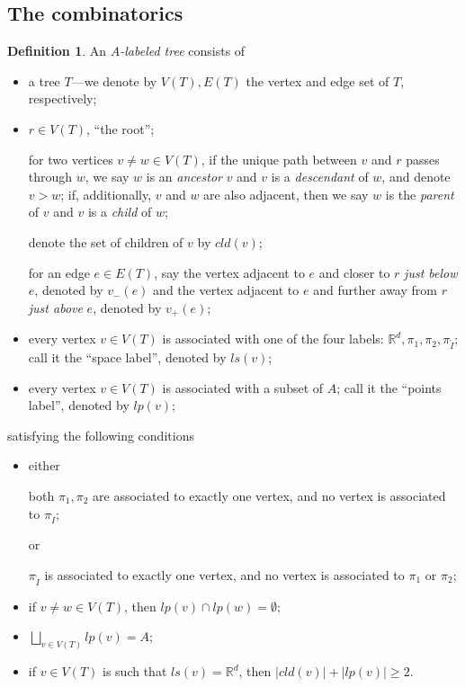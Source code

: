 \documentclass[11pt]{article}
\theoremstyle{definition}
\newtheorem{dfn}[thm]{Definition}
\theoremstyle{remark}
\def\R{\mathbb{R}}
\def\rI{{\mathring{I}}}
\begin{document}
\subsection{The combinatorics}
\begin{dfn}An {\it $A$-labeled tree} consists of
\begin{itemize}
\item a tree $T$---we denote by $V(T), E(T)$ the vertex and edge set of $T$, respectively;
\item $r\in V(T)$, ``the root''; 

for two vertices $v\neq w\in V(T)$, if the unique path between $v$ and $r$ passes through $w$, we say $w$ is an {\it ancestor} $v$ and $v$ is a {\it descendant} of $w$, and denote $v>w$; 
if, additionally, $v$ and $w$ are also adjacent, then we say $w$ is the {\it parent} of $v$ and $v$ is a {\it child} of $w$;  

denote the set of children of $v$ by $cld(v)$; 

for an edge $e\in E(T)$, say the vertex adjacent to $e$ and closer to $r$ {\it just below} $e$, denoted by $v_-(e)$ and the vertex adjacent to $e$ and further away from $r$ {\it just above} $e$, denoted by $v_+(e)$; 

\item every vertex $v\in V(T)$ is associated with one of the four labels: $\R^d, \pi_1, \pi_2,\pi_\rI$; call it the ``space label'', denoted by $ls(v)$; 

\item every vertex $v\in V(T)$ is associated with a subset of $A$; call it the ``points label'', denoted by $lp(v)$;
\end{itemize}
satisfying the following conditions
\begin{itemize}
\item either 

both $\pi_1, \pi_2$ are associated to exactly one vertex, and no vertex is associated to $\pi_\rI$;

or

$\pi_\rI$ is associated to exactly one vertex, and no vertex is associated to $\pi_1$ or $\pi_2$; 
\item if $v\neq w \in V(T)$, then $lp(v)\cap lp(w)=\emptyset$;
\item $\bigsqcup_{v\in V(T)}lp(v)=A$;
\item if $v\in V(T)$ is such that $ls(v)=\R^d$, then $|cld(v)|+|lp(v)|\ge2$. 
\end{itemize}
\end{dfn}
\end{document}
